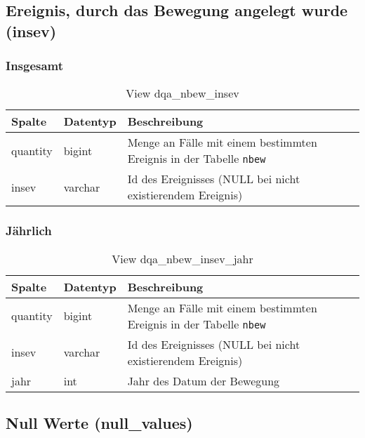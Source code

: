\newpage

\subsection{Ereignis, durch das Bewegung angelegt wurde (insev)} \label{subsec:bewEreig}

\subsubsection{Insgesamt} \label{subsubsec:bewEreigI}

\begin{table}[ht]
	\centering   
	\caption{View dqa\_nbew\_insev}
	\label{tab:bewEreigI}
	\begin{tabular}{||l|l|p{10cm}||}   		
		\hline
		Spalte & Datentyp & Beschreibung \\ [0.5ex]
		\hline\hline
		quantity & bigint & Menge an Fälle mit einem bestimmten Ereignis in der Tabelle \texttt{nbew} \\
		\hline
		insev & varchar & Id des Ereignisses (NULL bei nicht existierendem Ereignis)\\
		\hline
		
	\end{tabular}
\end{table}

\subsubsection{Jährlich} \label{subsubsec:bewEreigJ}

\begin{table}[ht]
	\centering   
	\caption{View dqa\_nbew\_insev\_jahr}
	\label{tab:bewEreigJ}
	\begin{tabular}{||l|l|p{10cm}||}   		
		\hline
		Spalte & Datentyp & Beschreibung \\ [0.5ex]
		\hline\hline
		quantity & bigint & Menge an Fälle mit einem bestimmten Ereignis in der Tabelle \texttt{nbew}\\
		\hline
		insev & varchar & Id des Ereignisses (NULL bei nicht existierendem Ereignis)\\
		\hline
		jahr & int &  Jahr des Datum der Bewegung \\
		\hline		
	\end{tabular}
\end{table}

\subsection{Null Werte (null\_values)} \label{subsec:bewNull}

